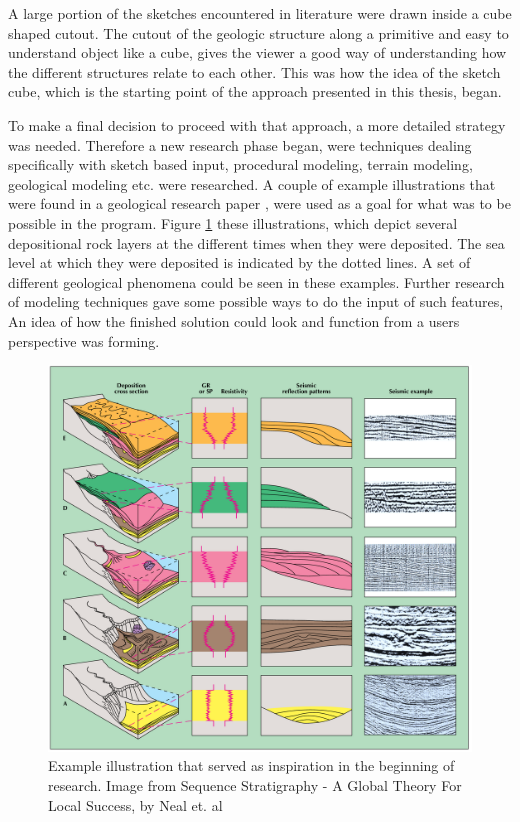 \documentclass[a4paper,12pt]{report}
\begin{document}
A large portion of the sketches encountered in literature were drawn inside a cube shaped cutout. The cutout of the geologic structure along a primitive and easy to understand object like a cube, gives the viewer a good way of understanding how the different structures relate to each other. This was how the idea of the sketch cube, which is the starting point of the approach presented in this thesis, began.

To make a final decision to proceed with that approach, a more detailed strategy was needed. Therefore a new research phase began, were techniques dealing specifically with sketch based input, procedural modeling, terrain modeling, geological modeling etc. were researched. A couple of example illustrations that were found in a geological research paper \cite{neal1993sequence}, were used as a goal for what was to be possible in the program. Figure \ref{fig:inspiration1} these illustrations, which depict several depositional rock layers at the different times when they were deposited. The sea level at which they were deposited is indicated by the dotted lines. A set of different geological phenomena could be seen in these examples. Further research of modeling techniques gave some possible ways to do the input of such features, An idea of how the finished solution could look and function from a users perspective was forming.


\begin{figure}
 \includegraphics[width=\linewidth]{thesis/inspiration1.png}
 \caption{Example illustration that served as inspiration in the beginning of research. Image from Sequence Stratigraphy - A Global Theory For Local Success, by Neal et. al}
 \label{fig:inspiration1}
\end{figure}
\end{document}
